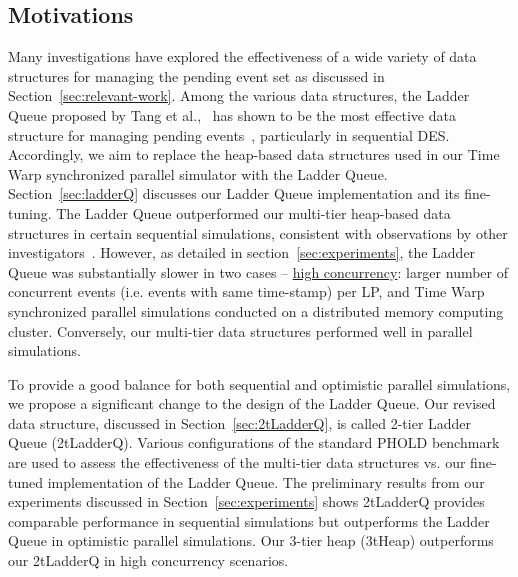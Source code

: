 \subsection{Motivations}
Many investigations have explored the effectiveness of a wide variety of data structures for managing the pending event set as discussed in Section~\ref{sec:relevant-work}. Among the various data structures, the Ladder Queue proposed by Tang et al.,~\cite{tang-05} has shown to be the most effective data structure for managing pending events~\cite{dickman-13,franceschini-15}, particularly in sequential DES. Accordingly, we aim to replace the heap-based data structures used in our Time Warp synchronized parallel simulator with the Ladder Queue. Section~\ref{sec:ladderQ} discusses our Ladder Queue implementation and its fine-tuning.
	The Ladder Queue outperformed our multi-tier heap-based data structures in certain sequential simulations, consistent with observations by other investigators~\cite{franceschini-15,yeom-14}. However, as detailed in section~\ref{sec:experiments}, the Ladder Queue was substantially slower in two cases -- 
\underline{high concurrency}: larger number of concurrent events (i.e. events with same time-stamp) per LP, and  Time Warp synchronized parallel simulations conducted on a distributed memory computing cluster. Conversely, our multi-tier data structures performed well in parallel simulations.

	To provide a good balance for both sequential and optimistic parallel simulations, we propose a significant change to the design of the Ladder Queue. Our revised data structure, discussed in Section~\ref{sec:2tLadderQ}, is called 2-tier Ladder Queue (2tLadderQ). Various configurations of the standard PHOLD benchmark are used to assess the effectiveness of the multi-tier data structures vs. our fine-tuned implementation of the Ladder Queue. The preliminary results from our experiments discussed in Section~\ref{sec:experiments} shows 2tLadderQ provides comparable performance in sequential simulations but outperforms the Ladder Queue in optimistic parallel simulations. Our 3-tier heap (3tHeap) outperforms our 2tLadderQ in high concurrency scenarios.
    

    
